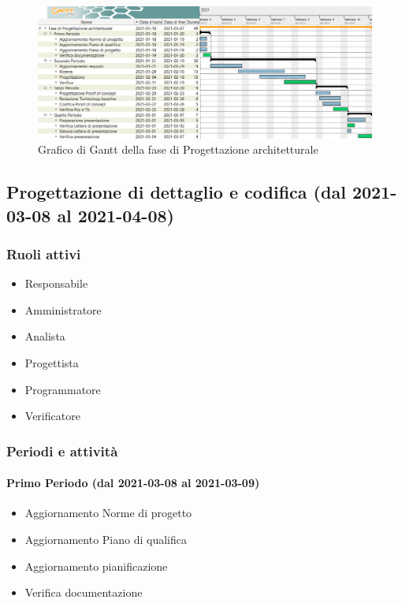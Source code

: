 \begin{landscape}
	\begin{figure}[H]
		\centering
		\includegraphics[width=\linewidth]{res/images/ganttFase2.png}
		\caption{Grafico di Gantt della fase di Progettazione architetturale}
		\label{fig:Gantt Analisi dei requisiti}
	\end{figure}
\end{landscape}

\subsection{Progettazione di dettaglio e codifica (dal 2021-03-08 al 2021-04-08)}

\subsubsection{Ruoli attivi}
\begin{itemize}
	\item Responsabile
	\item Amministratore
	\item Analista
	\item Progettista
	\item Programmatore
	\item Verificatore
\end{itemize}

\subsubsection{Periodi e attività}

\paragraph{Primo Periodo (dal 2021-03-08 al 2021-03-09)}
\begin{itemize}
	\item Aggiornamento Norme di progetto
	\item Aggiornamento Piano di qualifica
	\item Aggiornamento pianificazione
	\item Verifica documentazione
\end{itemize}

